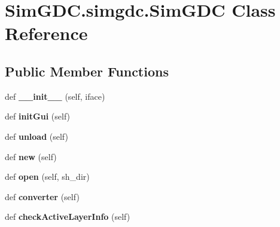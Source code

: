 \hypertarget{class_sim_g_d_c_1_1simgdc_1_1_sim_g_d_c}{}\section{Sim\+G\+D\+C.\+simgdc.\+Sim\+G\+D\+C Class Reference}
\label{class_sim_g_d_c_1_1simgdc_1_1_sim_g_d_c}
\subsection*{Public Member Functions}
\begin{DoxyCompactItemize}
\item 
\hypertarget{class_sim_g_d_c_1_1simgdc_1_1_sim_g_d_c_afc904b0a199af81e0147b00f307d9521}{}def {\bfseries \+\_\+\+\_\+init\+\_\+\+\_\+} (self, iface)\label{class_sim_g_d_c_1_1simgdc_1_1_sim_g_d_c_afc904b0a199af81e0147b00f307d9521}

\item 
\hypertarget{class_sim_g_d_c_1_1simgdc_1_1_sim_g_d_c_a33b3f0c85a7977ba4c3e9625f9d30946}{}def {\bfseries init\+Gui} (self)\label{class_sim_g_d_c_1_1simgdc_1_1_sim_g_d_c_a33b3f0c85a7977ba4c3e9625f9d30946}

\item 
\hypertarget{class_sim_g_d_c_1_1simgdc_1_1_sim_g_d_c_a156fff63f5a76883a38cf0eff0d41b60}{}def {\bfseries unload} (self)\label{class_sim_g_d_c_1_1simgdc_1_1_sim_g_d_c_a156fff63f5a76883a38cf0eff0d41b60}

\item 
\hypertarget{class_sim_g_d_c_1_1simgdc_1_1_sim_g_d_c_a0e076615a58eedaec58e363eab08447d}{}def {\bfseries new} (self)\label{class_sim_g_d_c_1_1simgdc_1_1_sim_g_d_c_a0e076615a58eedaec58e363eab08447d}

\item 
\hypertarget{class_sim_g_d_c_1_1simgdc_1_1_sim_g_d_c_a5a91eab6a89599e7e4ad37e337f596bb}{}def {\bfseries open} (self, sh\+\_\+dir)\label{class_sim_g_d_c_1_1simgdc_1_1_sim_g_d_c_a5a91eab6a89599e7e4ad37e337f596bb}

\item 
\hypertarget{class_sim_g_d_c_1_1simgdc_1_1_sim_g_d_c_a9f320f19f2557a1fcfc8bc4f8ace3e93}{}def {\bfseries converter} (self)\label{class_sim_g_d_c_1_1simgdc_1_1_sim_g_d_c_a9f320f19f2557a1fcfc8bc4f8ace3e93}

\item 
\hypertarget{class_sim_g_d_c_1_1simgdc_1_1_sim_g_d_c_a06a26c9e46c062bf2de9d64d6c4092cf}{}def {\bfseries check\+Active\+Layer\+Info} (self)\label{class_sim_g_d_c_1_1simgdc_1_1_sim_g_d_c_a06a26c9e46c062bf2de9d64d6c4092cf}


\end{DoxyCompactItemize}

